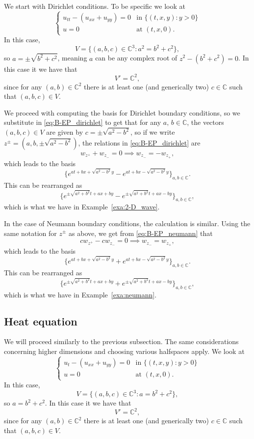 \documentclass{article} %
\theoremstyle{plain}
\theoremstyle{definition}
\theoremstyle{remark}
\newcommand{\CC}{\mathbb{C}}
\begin{document}
We start with Dirichlet conditions. To be specific we look at
$$
\begin{cases}
    u_{tt}-(u_{xx}+u_{yy})=0&\text{in }\{(t,x,y)\colon y>0\}\\
    u=0&\text{at }(t,x,0).
\end{cases}
$$
In this case,
$$
V=\{(a,b,c)\in \CC^3\colon a^2=b^2+c^2\},
$$
so $a=\pm\sqrt{b^2+c^2}$, meaning $a$ can be any complex root of $z^2-(b^2+c^2)=0$. In this case it we have that 
$$
V'=\CC^2,
$$
since for any $(a,b)\in \CC^2$ there is at least one (and generically two) $c\in \CC$ such that $(a,b,c)\in V$.

We proceed with computing the basis for Dirichlet boundary conditions, so we substitute in \eqref{eq:B-EP_dirichlet} to get that for any $a,\,b\in \CC$, the vectors $(a,b,c)\in V$ are given by $c=\pm\sqrt{a^2-b^2}$, so if we write $z^\pm=(a,b,\pm\sqrt{a^2-b^2})$, the relations in \eqref{eq:B-EP_dirichlet} are
$$
w_{z^+}+w_{z_-}=0\implies w_{z_-}=-w_{z_+},
$$
which leads to the basis
$$
\{e^{at+bx+\sqrt{a^2-b^2}y}-e^{at+bx-\sqrt{a^2-b^2}y}\}_{a,b\in\CC}.
$$
This can be rearranged as 
$$
\{e^{\pm\sqrt{a^2+b^2}t+ax+by}-e^{\pm\sqrt{a^2+b^2}t+ax-by}\}_{a,b\in\CC},
$$
which is what we have in Example~\ref{exa:2-D_wave}.

In the case of Neumann boundary conditions, the calculation is similar. Using the same notation for $z^{\pm}$ as above, we get from \eqref{eq:B-EP_neumann} that
$$
cw_{z^+}-cw_{z_-}=0\implies w_{z_-}=w_{z_+},
$$
which leads to the basis
$$
\{e^{at+bx+\sqrt{a^2-b^2}y}+e^{at+bx-\sqrt{a^2-b^2}y}\}_{a,b\in\CC}.
$$
This can be rearranged as 
$$
\{e^{\pm\sqrt{a^2+b^2}t+ax+by}+e^{\pm\sqrt{a^2+b^2}t+ax-by}\}_{a,b\in\CC},
$$
which is what we have in Example~\ref{exa:neumann}. 
\subsection{Heat equation}\label{sec:B-EPGP_heat_calc}
We will proceed similarly to the previous subsection. The same considerations concerning higher dimensions and choosing various halfspaces apply. We look at
$$
\begin{cases}
    u_{t}-(u_{xx}+u_{yy})=0&\text{in }\{(t,x,y)\colon y>0\}\\
    u=0&\text{at }(t,x,0).
\end{cases}
$$
In this case,
$$
V=\{(a,b,c)\in \CC^3\colon a=b^2+c^2\},
$$
so $a={b^2+c^2}$. In this case it we have that 
$$
V'=\CC^2,
$$
since for any $(a,b)\in \CC^2$ there is at least one (and generically two) $c\in \CC$ such that $(a,b,c)\in V$.
\end{document}

